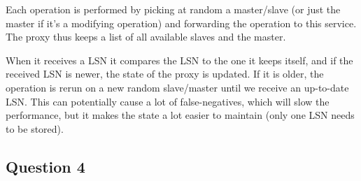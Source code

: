 \documentclass[a4paper,final]{article}
\begin{document}
Each operation is performed by picking at random a master/slave (or just the
master if it's a modifying operation) and forwarding the operation to this
service. The proxy thus keeps a list of all available slaves and the master.

When it receives a LSN it compares the LSN to the one it keeps itself, and if
the received LSN is newer, the state of the proxy is updated. If it is older,
the operation is rerun on a new random slave/master until we receive an
up-to-date LSN. This can potentially cause a lot of false-negatives, which
will slow the performance, but it makes the state a lot easier to maintain
(only one LSN needs to be stored).

\subsection*{Question 4}

\end{document}
